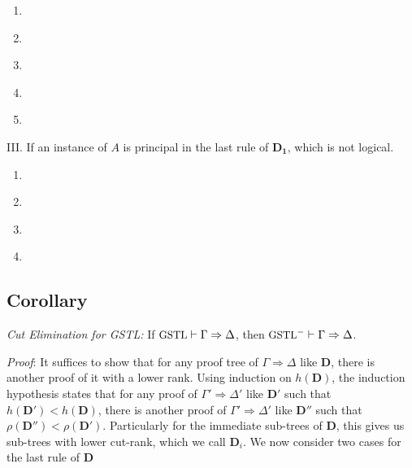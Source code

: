 \begin{enumerate}
	\begin{enumerate}[label={\Alph*.}]
		\item \label{c:ra-la1} 

		\item \label{c:ra-la2} 

		\item \label{c:ro1-lo} 

		\item \label{c:ro2-lo} 


		\item \label{c:ri-li} 

	\end{enumerate}

	III. If an instance of $A$ is principal in the last rule of $\mathbf{D_1}$, which is not logical.
	\begin{enumerate}[label={\roman*.}]
		\item \label{c:*-id} 

		\item \label{c:*-ex} 

		\item \label{c:*-lw-p} 
	
		\item \label{c:*-lc-p} 
	\end{enumerate}
\end{enumerate}

\subsection{Corollary} \label{cut-elim} \emph{Cut Elimination for GSTL: }
If $\small\text{GSTL} \vdash \Gamma \Rightarrow \Delta$, then $\small\text{GSTL}^- \vdash \Gamma \Rightarrow \Delta$.

\textit{Proof}: It suffices to show that for any proof tree of $\Gamma \Rightarrow \Delta$ like $\mathbf{D}$, there is another proof of it with a lower rank. Using induction on $h(\mathbf{D})$, the induction hypothesis states that for any proof of $\Gamma' \Rightarrow \Delta'$ like $\mathbf{D}'$ such that $h(\mathbf{D}') < h(\mathbf{D})$, there is another proof of $\Gamma' \Rightarrow \Delta'$ like $\mathbf{D}''$ such that $\rho(\mathbf{D}'') < \rho(\mathbf{D}')$. Particularly for the immediate sub-trees of $\mathbf{D}$, this gives us sub-trees with lower cut-rank, which we call $\mathbf{D}_i$. We now consider two cases for the last rule of $\mathbf{D}$

